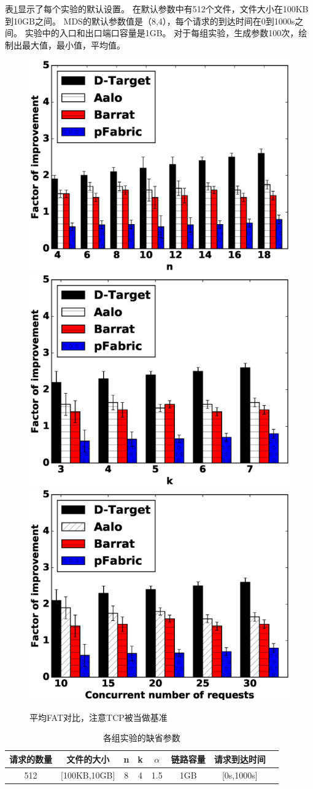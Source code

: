 表\ref{default-parameter}显示了每个实验的默认设置。
在默认参数中有512个文件，文件大小在100KB到10GB之间。 
MDS的默认参数值是（8,4），每个请求的到达时间在0到1000s之间。
实验中的入口和出口端口容量是1GB。
对于每组实验，生成参数100次，绘制出最大值，最小值，平均值。

\begin{figure}[h]
\centering
{}
 {\includegraphics[width=0.32\columnwidth]{figures/DTARGET/picture/evaluation/ex2/M.eps}}
{\includegraphics[width=0.32\columnwidth]{figures/DTARGET/picture//evaluation/ex2/N.eps}}
{\includegraphics[width=0.32\columnwidth]{figures/DTARGET/picture//evaluation/ex2/alpha.eps}}
\caption{平均FAT对比，注意TCP被当做基准}
\label{settings_fig}
\end{figure}

 
 \begin{table}[h]
\centering
\caption{各组实验的缺省参数}\label{default-parameter}
\renewcommand{\arraystretch}{1.5}
\begin{tabular}{|c|c|c|c|c|c|c|c|} \hline
\setlength{\tabcolsep}{10pt}
  请求的数量 &  文件的大小 & n & k &$\alpha$ &链路容量 &请求到达时间 \\ \hline
 512&  [100KB,10GB] & 8 & 4 &1.5&1GB&[0s,1000s]\\ \hline
\end{tabular}
\end{table}


